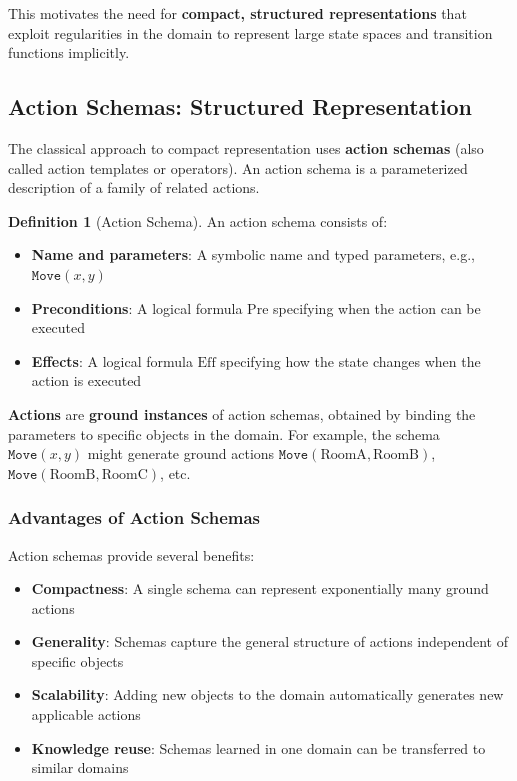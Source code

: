 \documentclass[11pt,a4paper]{article}
\theoremstyle{definition}
\newtheorem{definition}{Definition}[section]
\theoremstyle{plain}
\theoremstyle{remark}
\begin{document}
This motivates the need for \textbf{compact, structured representations} that exploit regularities in the domain to represent large state spaces and transition functions implicitly.

\subsection{Action Schemas: Structured Representation}

The classical approach to compact representation uses \textbf{action schemas} (also called action templates or operators). An action schema is a parameterized description of a family of related actions.

\begin{tcolorbox}[colback=cyan!5!white,colframe=cyan!75!black,title=\textbf{Action Schema}]
\begin{definition}[Action Schema]
An action schema consists of:
\begin{itemize}
    \item \textbf{Name and parameters}: A symbolic name and typed parameters, e.g., $\texttt{Move}(x, y)$
    \item \textbf{Preconditions}: A logical formula $\text{Pre}$ specifying when the action can be executed
    \item \textbf{Effects}: A logical formula $\text{Eff}$ specifying how the state changes when the action is executed
\end{itemize}
\end{definition}
\end{tcolorbox}

\textbf{Actions} are \textbf{ground instances} of action schemas, obtained by binding the parameters to specific objects in the domain. For example, the schema $\texttt{Move}(x, y)$ might generate ground actions $\texttt{Move}(\text{RoomA}, \text{RoomB})$, $\texttt{Move}(\text{RoomB}, \text{RoomC})$, etc.

\subsubsection{Advantages of Action Schemas}

Action schemas provide several benefits:

\begin{itemize}
    \item \textbf{Compactness}: A single schema can represent exponentially many ground actions
    \item \textbf{Generality}: Schemas capture the general structure of actions independent of specific objects
    \item \textbf{Scalability}: Adding new objects to the domain automatically generates new applicable actions
    \item \textbf{Knowledge reuse}: Schemas learned in one domain can be transferred to similar domains
\end{itemize}
\end{document}
